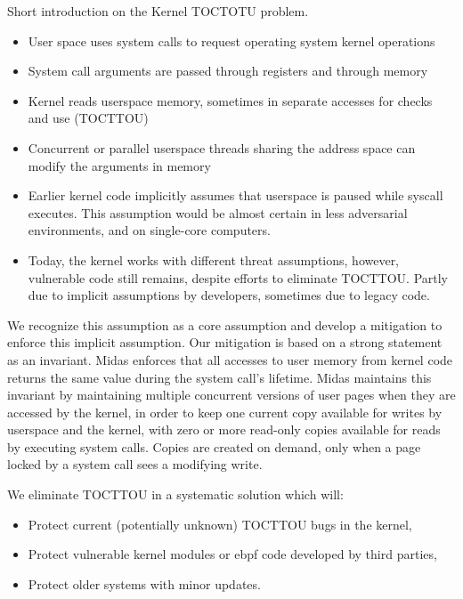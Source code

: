 Short introduction on the Kernel TOCTOTU problem.
\begin{itemize}
      \item User space uses system calls to request operating system kernel operations
      \item System call arguments are passed through registers and through memory
      \item Kernel reads userspace memory, sometimes in separate accesses for checks
            and use (TOCTTOU)
      \item Concurrent or parallel userspace threads sharing the address space can 
            modify the arguments in memory
      \item Earlier kernel code implicitly assumes that userspace is paused while
            syscall executes. This assumption would be almost certain in less
            adversarial environments, and on single-core computers.
      \item Today, the kernel works with different threat assumptions, however, 
            vulnerable code still remains, despite efforts to eliminate TOCTTOU.
            Partly due to implicit assumptions
            by developers, sometimes due to legacy code.
\end{itemize}

We recognize this assumption as a core assumption and develop a mitigation
to enforce this implicit assumption.
Our mitigation is based on a strong statement as an invariant. 
Midas enforces that all accesses to user memory from kernel code returns
the same value during the system call's lifetime.
Midas maintains this invariant by maintaining multiple concurrent versions
of user pages when they are accessed by the kernel, in order to keep one
current copy available for writes by userspace and the kernel, 
with zero or more read-only copies available for reads by executing system calls.
Copies are created on demand, only when a page locked by a system call sees
a modifying write.

We eliminate TOCTTOU in a systematic solution which will:
\begin{itemize}
      \item Protect current (potentially unknown) TOCTTOU bugs in the kernel,
      \item Protect vulnerable kernel modules or ebpf code developed 
            by third parties,
      \item Protect older systems with minor updates.
\end{itemize}

